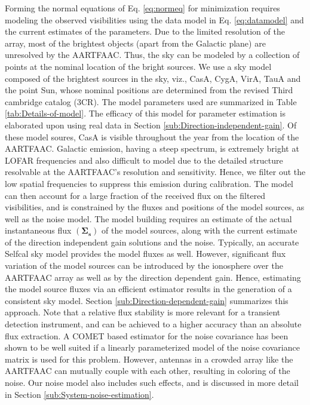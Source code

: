 \documentclass{aa}
\begin{document}
Forming the  normal equations of  Eq. \ref{eq:normeq} for  minimization requires
modeling    the    observed   visibilities    using    the    data   model    in
Eq. \ref{eq:datamodel} and the current  estimates of the parameters.  Due to the
limited resolution of  the array, most of the brightest  objects (apart from the
Galactic plane) are unresolved by the AARTFAAC.  Thus, the sky can be modeled by
a collection of points  at the nominal location of the bright  sources. We use a
sky model composed of the brightest  sources in the sky, viz., CasA, CygA, VirA,
TauA and the point Sun, whose  nominal positions are determined from the revised
Third cambridge catalog (3CR). The model parameters used are summarized in Table
\ref{tab:Details-of-model}. The efficacy of  this model for parameter estimation
is      elaborated      upon      using      real      data      in      Section
\ref{sub:Direction-independent-gain}.   Of these model  soures, CasA  is visible
throughout the year from the location of the AARTFAAC. Galactic emission, having
a steep spectrum, is extremely bright at LOFAR frequencies and also difficult to
model due to the detailed  structure resolvable at the AARTFAAC's resolution and
sensitivity. Hence, we  filter out the low spatial  frequencies to suppress this
emission during calibration. The model can  then account for a large fraction of
the received flux on the filtered visibilities, and is constrained by the fluxes
and  positions of  the model  sources, as  well as  the noise  model.  The model
building   requires    an   estimate   of   the    actual   instantaneous   flux
$\left(\mathbf{\Sigma_{s}}\right)$ of the model  sources, along with the current
estimate of the  direction independent gain solutions and  the noise. Typically,
an  accurate Selfcal  sky  model provides  the  model fluxes  as well.  However,
significant  flux  variation of  the  model sources  can  be  introduced by  the
ionosphere  over  the AARTFAAC  array  as well  as  by  the direction  dependent
gain.  Hence, estimating  the model  source  fluxes via  an efficient  estimator
results   in    the   generation   of   a   consistent    sky   model.   Section
\ref{sub:Direction-dependent-gain}  summarizes   this  approach.  Note   that  a
relative flux stability  is more relevant for a  transient detection instrument,
and can  be achieved to  a higher accuracy  than an absolute flux  extraction. A
COMET based estimator for the noise  covariance has been shown to be well suited
if a  linearly parameterized model  of the noise  covariance matrix is  used for
this  problem\citep{ottersten1998covariance}.  However,  antennas in  a  crowded
array  like the  AARTFAAC  can mutually  couple  with each  other, resulting  in
coloring  of the  noise. Our  noise  model also  includes such  effects, and  is
discussed in more detail in Section \ref{sub:System-noise-estimation}.
\end{document}
